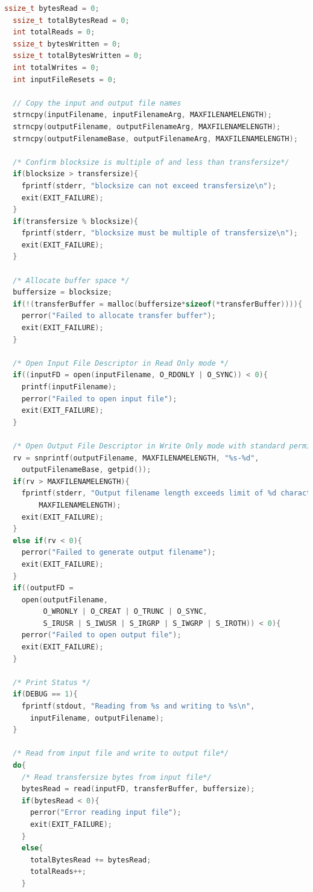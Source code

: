 \documentclass{article}
\begin{document}
\begin{lstlisting}[language=c]
  ssize_t bytesRead = 0;
  ssize_t totalBytesRead = 0;
  int totalReads = 0;
  ssize_t bytesWritten = 0;
  ssize_t totalBytesWritten = 0;
  int totalWrites = 0;
  int inputFileResets = 0;

  // Copy the input and output file names
  strncpy(inputFilename, inputFilenameArg, MAXFILENAMELENGTH);
  strncpy(outputFilename, outputFilenameArg, MAXFILENAMELENGTH);
  strncpy(outputFilenameBase, outputFilenameArg, MAXFILENAMELENGTH);

  /* Confirm blocksize is multiple of and less than transfersize*/
  if(blocksize > transfersize){
  	fprintf(stderr, "blocksize can not exceed transfersize\n");
  	exit(EXIT_FAILURE);
  }
  if(transfersize % blocksize){
  	fprintf(stderr, "blocksize must be multiple of transfersize\n");
  	exit(EXIT_FAILURE);
  }

  /* Allocate buffer space */
  buffersize = blocksize;
  if(!(transferBuffer = malloc(buffersize*sizeof(*transferBuffer)))){
  	perror("Failed to allocate transfer buffer");
  	exit(EXIT_FAILURE);
  }

  /* Open Input File Descriptor in Read Only mode */
  if((inputFD = open(inputFilename, O_RDONLY | O_SYNC)) < 0){
    printf(inputFilename);
  	perror("Failed to open input file");
  	exit(EXIT_FAILURE);
  }

  /* Open Output File Descriptor in Write Only mode with standard permissions*/
  rv = snprintf(outputFilename, MAXFILENAMELENGTH, "%s-%d",
    outputFilenameBase, getpid());
  if(rv > MAXFILENAMELENGTH){
  	fprintf(stderr, "Output filename length exceeds limit of %d characters.\n",
  		MAXFILENAMELENGTH);
  	exit(EXIT_FAILURE);
  }
  else if(rv < 0){
  	perror("Failed to generate output filename");
  	exit(EXIT_FAILURE);
  }
  if((outputFD =
  	open(outputFilename,
  	     O_WRONLY | O_CREAT | O_TRUNC | O_SYNC,
  	     S_IRUSR | S_IWUSR | S_IRGRP | S_IWGRP | S_IROTH)) < 0){
  	perror("Failed to open output file");
  	exit(EXIT_FAILURE);
  }

  /* Print Status */
  if(DEBUG == 1){
    fprintf(stdout, "Reading from %s and writing to %s\n",
      inputFilename, outputFilename);
  }

  /* Read from input file and write to output file*/
  do{
  	/* Read transfersize bytes from input file*/
  	bytesRead = read(inputFD, transferBuffer, buffersize);
  	if(bytesRead < 0){
      perror("Error reading input file");
      exit(EXIT_FAILURE);
  	}
  	else{
      totalBytesRead += bytesRead;
      totalReads++;
  	}


\end{lstlisting}
\end{document}

